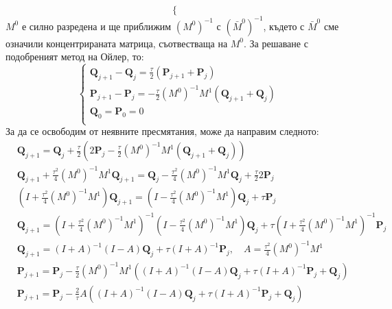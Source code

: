\documentclass[12pt]{article}
\begin{document}
\begin{large}
\begin{equation}
\begin{cases}
    \end{cases}
\end{equation}
$M^0$ е силно разредена и ще приближим $(M^0)^{-1}$ с $(\bar{M}^0)^{-1}$, където с $\bar{M}^0$ сме означили концентрираната матрица, съотвестваща на $M^0$. За решаване с подобреният метод на Ойлер, то:
\begin{equation}
    \begin{cases}
      \mathbf{Q}_{j + 1} - \mathbf{Q}_j = \frac{\tau}{2} \left( \mathbf{P}_{j + 1} + \mathbf{P}_j \right) \\
      \mathbf{P}_{j + 1} - \mathbf{P}_j = -\frac{\tau}{2} (M^0)^{-1} M^1 \left( \mathbf{Q}_{j + 1} + \mathbf{Q}_j \right) \\
      \mathbf{Q}_0 = \mathbf{P}_0 = 0 \\
    \end{cases}
\end{equation}
За да се освободим от неявните пресмятания, може да направим следното:
\begin{align*}
&\mathbf{Q}_{j + 1} = \mathbf{Q}_j + \frac{\tau}{2} \left( 2\mathbf{P}_j -\frac{\tau}{2} (M^0)^{-1} M^1 \left( \mathbf{Q}_{j + 1} + \mathbf{Q}_j \right) \right) \\
&\mathbf{Q}_{j + 1} + \frac{\tau^2}{4} (M^0)^{-1} M^1 \mathbf{Q}_{j+1} = \mathbf{Q}_j - \frac{\tau^2}{4} (M^0)^{-1} M^1 \mathbf{Q}_j + \frac{\tau}{2} 2\mathbf{P}_j \\
&\left(I + \frac{\tau^2}{4} (M^0)^{-1} M^1 \right)\mathbf{Q}_{j + 1} = \left(I - \frac{\tau^2}{4} (M^0)^{-1} M^1 \right) \mathbf{Q}_j + \tau \mathbf{P}_j \\
&\mathbf{Q}_{j + 1} = \left(I + \frac{\tau^2}{4} (M^0)^{-1} M^1 \right)^{-1} \left(I - \frac{\tau^2}{4} (M^0)^{-1} M^1 \right) \mathbf{Q}_j + \tau \left(I + \frac{\tau^2}{4} (M^0)^{-1} M^1 \right)^{-1} \mathbf{P}_j \\
&\mathbf{Q}_{j + 1} = \left(I + A \right)^{-1} \left(I - A \right) \mathbf{Q}_j + \tau \left(I + A \right)^{-1} \mathbf{P}_j, \quad A = \frac{\tau^2}{4} (M^0)^{-1} M^1 \\
&\mathbf{P}_{j + 1} = \mathbf{P}_j -\frac{\tau}{2}  (M^0)^{-1} M^1 \left(\left(I + A \right)^{-1} \left(I - A \right) \mathbf{Q}_j + \tau \left(I + A \right)^{-1} \mathbf{P}_j + \mathbf{Q}_j \right) \\
&\mathbf{P}_{j + 1} = \mathbf{P}_j -\frac{2}{\tau} A \left(\left(I + A \right)^{-1} \left(I - A \right) \mathbf{Q}_j + \tau \left(I + A \right)^{-1} \mathbf{P}_j + \mathbf{Q}_j \right) \\

\end{align*}
\end{large}
\end{document}
